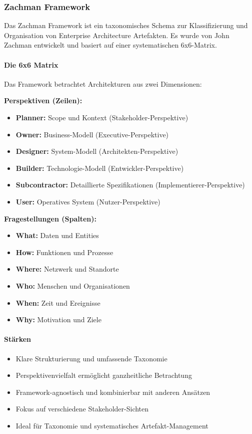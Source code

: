 \subsubsection{Zachman Framework}
\label{subsubsec:zachman}

Das Zachman Framework ist ein taxonomisches Schema zur Klassifizierung und Organisation von Enterprise Architecture Artefakten. Es wurde von John Zachman entwickelt und basiert auf einer systematischen 6x6-Matrix.

\paragraph{Die 6x6 Matrix}
Das Framework betrachtet Architekturen aus zwei Dimensionen:

\textbf{Perspektiven (Zeilen):}
\begin{itemize}
\item \textbf{Planner:} Scope und Kontext (Stakeholder-Perspektive)
\item \textbf{Owner:} Business-Modell (Executive-Perspektive)
\item \textbf{Designer:} System-Modell (Architekten-Perspektive)
\item \textbf{Builder:} Technologie-Modell (Entwickler-Perspektive)
\item \textbf{Subcontractor:} Detaillierte Spezifikationen (Implementierer-Perspektive)
\item \textbf{User:} Operatives System (Nutzer-Perspektive)
\end{itemize}

\textbf{Fragestellungen (Spalten):}
\begin{itemize}
\item \textbf{What:} Daten und Entities
\item \textbf{How:} Funktionen und Prozesse
\item \textbf{Where:} Netzwerk und Standorte
\item \textbf{Who:} Menschen und Organisationen
\item \textbf{When:} Zeit und Ereignisse
\item \textbf{Why:} Motivation und Ziele
\end{itemize}

\paragraph{Stärken}
\begin{itemize}
\item Klare Strukturierung und umfassende Taxonomie
\item Perspektivenvielfalt ermöglicht ganzheitliche Betrachtung
\item Framework-agnostisch und kombinierbar mit anderen Ansätzen
\item Fokus auf verschiedene Stakeholder-Sichten
\item Ideal für Taxonomie und systematisches Artefakt-Management
\end{itemize}

